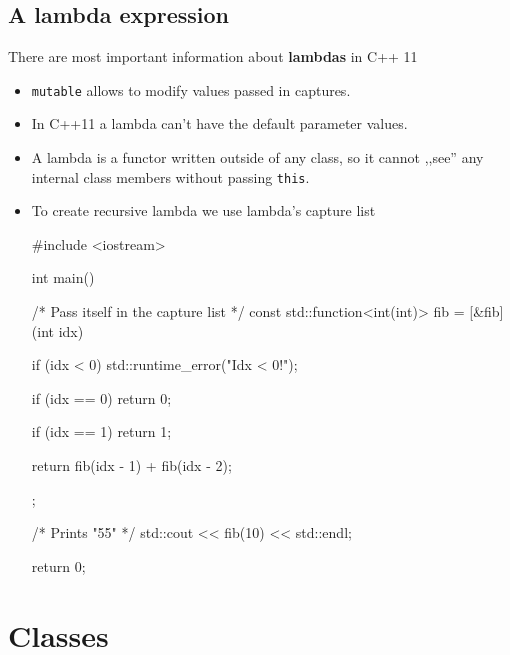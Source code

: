 \documentclass[../main]{subfiles}
\begin{document}
\subsection{A lambda expression}
    There are most important information about \textbf{lambdas} in C++ 11
\begin{itemize}
    \item \texttt{mutable} allows to modify values passed in captures.
    \item In C++11 a lambda can't have the default parameter values.
    \item A lambda is a functor written outside of any class, so it cannot ,,see'' any internal class members without passing \texttt{this}.
    \item To create recursive lambda we use lambda's capture list
    \begin{Code}
        #include <iostream>
        
        int main()
        {
            /* Pass itself in the capture list */
            const std::function<int(int)> fib = [&fib](int idx)
            {
               if (idx < 0)
               {
                  std::runtime_error("Idx < 0!");
               }
               
               if (idx == 0)
               {
                  return 0;
               }
               
               if (idx == 1)
               {
                  return 1;
               }
               
               return fib(idx - 1) + fib(idx - 2);
            };

            /* Prints "55" */
            std::cout << fib(10) << std::endl;
            
            return 0;
        }
    \end{Code}
    
\end{itemize}

\section{Classes}
\end{document}
